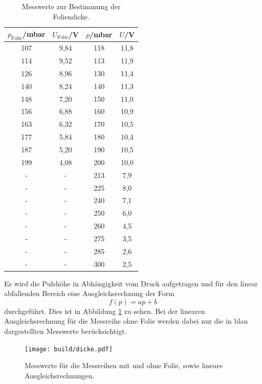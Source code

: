 \begin{table}[htp]
	\begin{center}
    \caption{Messwerte zur Bestimmung der Foliendicke.}
    \label{tab:dicke}
		\begin{tabular}{cccc}
		\toprule
			{$p_\text{Folie}$/mbar} & {$U_{\text{Folie}}$/V} & {$p$/mbar} & {$U$/V}\\
			\midrule
			107 & 9,84 & 118 & 11,8\\
			114 & 9,52 & 113 & 11,9\\
			126 & 8,96 & 130 & 11,4\\
			140 & 8,24 & 140 & 11,3\\
			148 & 7,20 & 150 & 11,0\\
			156 & 6,88 & 160 & 10,9\\
			163 & 6,32 & 170 & 10,5\\
			177 & 5,84 & 180 & 10,4\\
			187 & 5,20 & 190 & 10,5\\
			199 & 4,08 & 200 & 10,0\\
			- & -  & 213 & 7,9\\
			- & -  & 225 & 8,0\\
			- & -  & 240 & 7,1\\
			- & -  & 250 & 6,0\\
			- & -  & 260 & 4,5\\
			- & -  & 275 & 3,5\\
			- & -  & 285 & 2,6\\
			- & -  & 300 & 2,5\\
		\bottomrule
		\end{tabular}
	\end{center}
\end{table}

Es wird die Pulshöhe in Abhängigkeit vom Druck aufgetragen und für den
linear abfallenden Bereich eine Ausgleichsrechnung der Form
\begin{equation*}
  f(p)=ap+b
\end{equation*}
durchgeführt. Dies ist in Abbildung \ref{fig:dicke} zu sehen. Bei der linearen Ausgleichsrechnung
für die Messreihe ohne Folie werden dabei nur die in blau dargestellten Messwerte berücksichtigt.

\begin{figure}
  \centering
  \texttt{[image: build/dicke.pdf]}
  \caption{Messwerte für die Messreihen mit und ohne Folie, sowie lineare Ausgleichsrechnungen.}
  \label{fig:dicke}
\end{figure}

